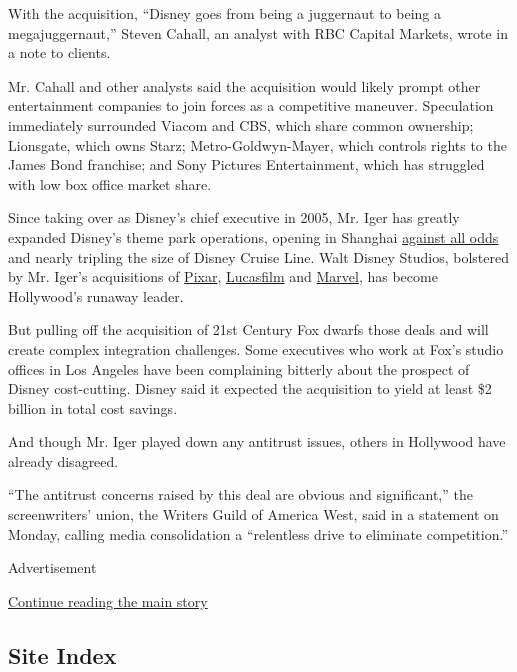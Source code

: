With the acquisition, ``Disney goes from being a juggernaut to being a
megajuggernaut,'' Steven Cahall, an analyst with RBC Capital Markets,
wrote in a note to clients.

Mr. Cahall and other analysts said the acquisition would likely prompt
other entertainment companies to join forces as a competitive maneuver.
Speculation immediately surrounded Viacom and CBS, which share common
ownership; Lionsgate, which owns Starz; Metro-Goldwyn-Mayer, which
controls rights to the James Bond franchise; and Sony Pictures
Entertainment, which has struggled with low box office market share.

Since taking over as Disney's chief executive in 2005, Mr. Iger has
greatly expanded Disney's theme park operations, opening in Shanghai
\href{https://www.nytimes3xbfgragh.onion/2016/06/15/business/international/china-disney.html?_r=0}{against
all odds} and nearly tripling the size of Disney Cruise Line. Walt
Disney Studios, bolstered by Mr. Iger's acquisitions of
\href{http://www.nytimes3xbfgragh.onion/2006/01/25/business/disney-agrees-to-acquire-pixar-in-a-74-billion-deal.html}{Pixar},
\href{https://mediadecoder.blogs.nytimes3xbfgragh.onion/2012/10/30/disney-buying-lucas-films-for-4-billion/}{Lucasfilm}
and
\href{http://www.nytimes3xbfgragh.onion/2009/09/01/business/media/01disney.html}{Marvel},
has become Hollywood's runaway leader.

But pulling off the acquisition of 21st Century Fox dwarfs those deals
and will create complex integration challenges. Some executives who work
at Fox's studio offices in Los Angeles have been complaining bitterly
about the prospect of Disney cost-cutting. Disney said it expected the
acquisition to yield at least \$2 billion in total cost savings.

And though Mr. Iger played down any antitrust issues, others in
Hollywood have already disagreed.

``The antitrust concerns raised by this deal are obvious and
significant,'' the screenwriters' union, the Writers Guild of America
West, said in a statement on Monday, calling media consolidation a
``relentless drive to eliminate competition.''

Advertisement

\protect\hyperlink{after-bottom}{Continue reading the main story}

\hypertarget{site-index}{%
\subsection{Site Index}\label{site-index}}

